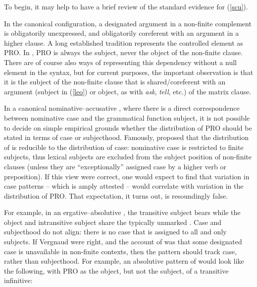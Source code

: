 \documentclass[output=paper]{langsci/langscibook}
\begin{document}
To begin, it may help to have a brief review of the standard evidence for
(\ref{scu}).

In the canonical  configuration, a designated argument in a non-finite
complement is obligatorily unexpressed, and obligatorily coreferent with an
argument in a higher clause. A long established tradition represents the
controlled element as PRO. In , PRO is always the subject, never the
object of the non-finite clause. There are of course also ways of representing
this dependency without a null element in the syntax, but for current purposes,
the important observation is that it is the subject of the non-finite clause
that is shared/coreferent with an argument (subject in (\ref{leo}) or object,
as with \emph{ask}, \emph{tell}, etc.) of the matrix clause.

\ea \label{leo}	\begin{xlista}
	\end{xlista}
\z

In a canonical nominative--accusative , where there is a direct
correspondence between nominative case and the grammatical function subject, it
is not possible to decide on simple empirical grounds whether the distribution
of PRO should be stated in terms of case or subjecthood. Famously,
\cite{Vergnaud1977,Chomsky1980} proposed that the distribution of  is
reducible to the distribution of case:  nominative case is restricted to
finite subjects, thus lexical subjects are excluded from the subject position
of non-finite clauses (unless they are \enquote{exceptionally} assigned case by
a higher verb or preposition).  If this view were correct, one would expect to
find that variation in case patterns -- which is amply attested -- would
correlate with variation in the distribution of PRO. That expectation, it turns
out, is resoundingly false.

For example, in an ergative--absolutive , the transitive subject bears
 while the object and intransitive subject share the typically
unmarked . Case and subjecthood do not align: there is no case
that is assigned to all and only subjects. If Vergnaud were right, and the
account of  was that some designated case is unavailable in non-finite
contexts, then the  pattern should track case, rather than subjecthood.
For example, an absolutive pattern of  would look like the following,
with PRO as the object, but not the subject, of a transitive infinitive:
\end{document}
